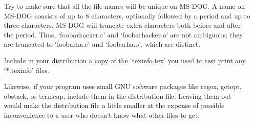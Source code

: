    Try to make sure that all the file names will be unique on MS-DOG.  A
name on MS-DOG consists of up to 8 characters, optionally followed by a
period and up to three characters.  MS-DOG will truncate extra
characters both before and after the period.  Thus, `foobarhacker.c'
and `foobarhacker.o' are not ambiguous; they are truncated to
`foobarha.c' and `foobarha.o', which are distinct.

   Include in your distribution a copy of the `texinfo.tex' you used to
test print any `*.texinfo' files.

   Likewise, if your program uses small GNU software packages like
regex, getopt, obstack, or termcap, include them in the distribution
file.  Leaving them out would make the distribution file a little
smaller at the expense of possible inconvenience to a user who doesn't
know what other files to get.

